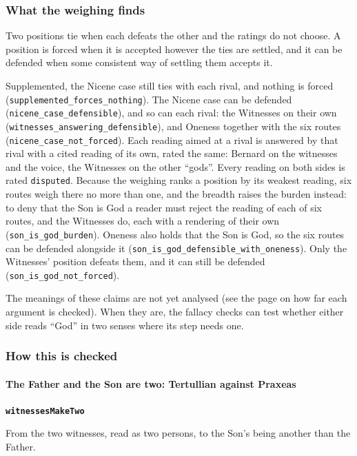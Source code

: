 \documentclass[11pt,paper=\testimonypaper,DIV=13,parskip=false]{scrartcl}
\begin{document}
\subsubsection*{What the weighing finds}
Two positions tie when each defeats the other and the ratings do not choose. A position is forced when it is accepted however the ties are settled, and it can be defended when some consistent way of settling them accepts it.

Supplemented, the Nicene case still ties with each rival, and nothing is forced (\texttt{supplemented\_\allowbreak{}forces\_\allowbreak{}nothing}). The Nicene case can be defended (\texttt{nicene\_\allowbreak{}case\_\allowbreak{}defensible}), and so can each rival: the Witnesses on their own (\texttt{witnesses\_\allowbreak{}answering\_\allowbreak{}defensible}), and Oneness together with the six routes (\texttt{nicene\_\allowbreak{}case\_\allowbreak{}not\_\allowbreak{}forced}). Each reading aimed at a rival is answered by that rival with a cited reading of its own, rated the same: Bernard on the witnesses and the voice, the Witnesses on the other “gods”. Every reading on both sides is rated \texttt{disputed}. Because the weighing ranks a position by its weakest reading, six routes weigh there no more than one, and the breadth raises the burden instead: to deny that the Son is God a reader must reject the reading of each of six routes, and the Witnesses do, each with a rendering of their own (\texttt{son\_\allowbreak{}is\_\allowbreak{}god\_\allowbreak{}burden}). Oneness also holds that the Son is God, so the six routes can be defended alongside it (\texttt{son\_\allowbreak{}is\_\allowbreak{}god\_\allowbreak{}defensible\_\allowbreak{}with\_\allowbreak{}oneness}). Only the Witnesses’ position defeats them, and it can still be defended (\texttt{son\_\allowbreak{}is\_\allowbreak{}god\_\allowbreak{}not\_\allowbreak{}forced}).

The meanings of these claims are not yet analysed (see the page on how far each argument is checked). When they are, the fallacy checks can test whether either side reads “God” in two senses where its step needs one.

\subsubsection*{How this is checked}
\paragraph*{The Father and the Son are two: Tertullian against Praxeas}
\leavevmode\par\nobreak
\par\medskip\noindent\textbf{\texttt{witnesses\allowbreak{}Make\allowbreak{}Two}}\par\nobreak\noindent
From the two witnesses, read as two persons, to the Son’s being another than the Father.
\end{document}
